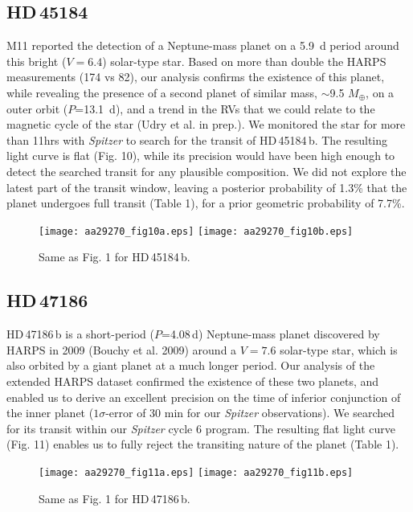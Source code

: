 \documentclass[traditabstract]{aa}
\begin{document}
\subsection{HD\,45184}


M11 reported the detection of a Neptune-mass planet on a 5.9~d period around this bright ($V=6.4$) 
solar-type star. Based on  more than double the HARPS measurements (174 vs 82), our analysis confirms 
the existence of this planet, while revealing the presence of a second planet of similar mass, $\sim$9.5 $M_\oplus$,
on a outer orbit ($P$=13.1~d), and a trend in the RVs that we could relate to the magnetic cycle of the star (Udry et al. in prep.).
 We monitored the star for  more than 11hrs with {\it Spitzer} to search for the transit of HD\,45184\,b. The resulting light
  curve is flat (Fig. 10), while its precision would have been high enough to detect the searched transit for any plausible composition. 
We did not explore the latest part of the transit window, leaving a posterior probability of 1.3\% that the planet undergoes full transit (Table 1), 
for a prior geometric probability of 7.7\%.

\begin{figure}
\label{fig:11}
\centering                     
\texttt{[image: aa29270\_fig10a.eps]}
\texttt{[image: aa29270\_fig10b.eps]}
\caption{Same as Fig. 1 for HD\,45184\,b.}
\end{figure}

\subsection{HD\,47186}

HD\,47186\,b is a short-period ($P$=4.08\,d) Neptune-mass planet discovered by HARPS in 2009 (Bouchy et al. 2009) around a $V=7.6$ 
solar-type star, which is also orbited by a giant planet at a much longer period. Our analysis of the extended HARPS dataset confirmed the existence of 
these two planets, and enabled us to derive an excellent precision on the time of inferior conjunction of the inner planet ($1\sigma$-error of 30 min for 
our {\it Spitzer} observations). We searched for its transit within our {\it Spitzer}  cycle 6 program. The resulting flat light curve (Fig. 11) enables us  to fully reject the transiting nature of the planet (Table 1). 

\begin{figure}
\label{fig:12}
\centering                     
\texttt{[image: aa29270\_fig11a.eps]}
\texttt{[image: aa29270\_fig11b.eps]}
\caption{Same as Fig. 1 for HD\,47186\,b.}
\end{figure}
\end{document}
